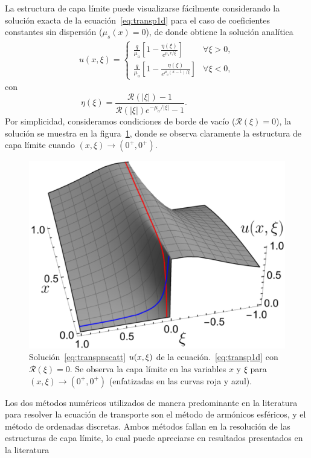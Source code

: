 La estructura de capa límite puede visualizarse fácilmente 
considerando la solución exacta de la ecuación~\eqref{eq:transp1d} 
para el caso de coeficientes constantes sin dispersión ($\mu_s(x)=0$), 
de donde obtiene la solución analítica 
\begin{equation}
\begin{split}
u(x,\xi)=\begin{cases}
\displaystyle \frac{q}{\mu_a}\left[1-\frac{\eta(\xi)}{ e^{\mu_a x / \xi}}\right]&\forall\xi>0,\\[8pt]
\displaystyle  \frac{q}{\mu_a}\left[1- \frac{\eta(\xi)}{e^{\mu_a (x-1) / \xi}} \right]&\forall\xi<0,
\end{cases}
\end{split}
\label{eq:transpnscatt}
\end{equation}
con
\begin{equation*}
\;\;\eta(\xi)=\frac{\mathcal{R}(|\xi|)-1}{\mathcal{R}(|\xi|)e^{-\mu_a/|\xi|}-1}.\qquad\qquad\qquad
\end{equation*}
Por simplicidad, consideramos condiciones de borde de vacío ($\mathcal{R}(\xi)=0$), 
la solución se muestra en la figura~\ref{fig:ansol}, donde se observa claramente la estructura de capa 
límite cuando $(x,\xi) \to (0^+,0^+)$.
\begin{figure}[h!]
\centering
  \includegraphics[width=0.5\linewidth]{figuras/Analytic_lay_3.pdf}
  \caption{Solución~\eqref{eq:transpnscatt} $u(x,\xi)$ de la ecuación.~\eqref{eq:transp1d} con
  $\mathcal{R}(\xi)=0$. Se observa la capa límite en las variables $x$ y $\xi$ 
  para $(x,\xi) \to (0^+,0^+)$ (enfatizadas en las curvas roja y azul).}
 \label{fig:ansol}
\end{figure}

Los dos métodos numéricos utilizados de manera predominante en la literatura 
para resolver la ecuación de transporte son 
el método de armónicos esféricos,  
y el método de ordenadas discretas. Ambos métodos fallan 
en la resolución de las estructuras de capa límite, 
lo cual puede apreciarse en resultados presentados 
en la literatura~\cite{Rocheleau2020,Wang2019,Harel2020,Anli2006,Chai1993}

